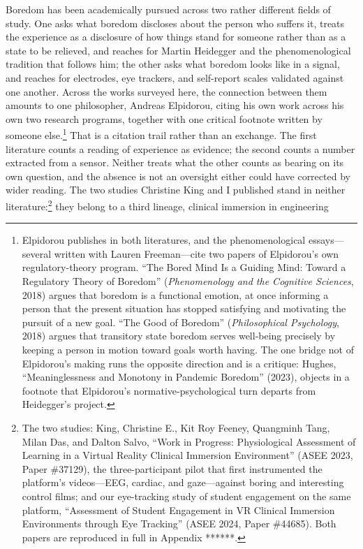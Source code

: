 Boredom has been academically pursued across two rather different fields of study. One asks
what boredom discloses about the person who suffers it, treats the experience as a disclosure
of how things stand for someone rather than as a state to be relieved, and reaches for Martin
Heidegger and the phenomenological tradition that follows him; the other asks what boredom
looks like in a signal, and reaches for electrodes, eye trackers, and self-report scales
validated against one another. Across the works surveyed here, the connection between them
amounts to one philosopher, Andreas Elpidorou, citing his own work across his own two research
programs, together with one critical footnote written by someone else.\footnote{Elpidorou
publishes in both literatures, and the phenomenological essays---several written with Lauren
Freeman---cite two papers of Elpidorou's own regulatory-theory program. ``The Bored Mind Is a
Guiding Mind: Toward a Regulatory Theory of Boredom'' (\textit{Phenomenology and the Cognitive
Sciences}, 2018) argues that boredom is a functional emotion, at once informing a person that
the present situation has stopped satisfying and motivating the pursuit of a new goal. ``The
Good of Boredom'' (\textit{Philosophical Psychology}, 2018) argues that transitory state
boredom serves well-being precisely by keeping a person in motion toward goals worth having.
The one bridge not of Elpidorou's making runs the opposite direction and is a critique:
Hughes, ``Meaninglessness and Monotony in Pandemic Boredom'' (2023), objects in a footnote
that Elpidorou's normative-psychological turn departs from Heidegger's project.} That is a
citation trail rather than an exchange. The first literature counts a reading of experience
as evidence; the second counts a number extracted from a sensor. Neither treats what the
other counts as bearing on its own question, and the absence is not an oversight either could
have corrected by wider reading. The two studies Christine King and I published stand in
neither literature:\footnote{The two studies: King, Christine E., Kit Roy Feeney, Quangminh
Tang, Milan Das, and Dalton Salvo, ``Work in Progress: Physiological Assessment of Learning
in a Virtual Reality Clinical Immersion Environment'' (ASEE 2023, Paper \#37129), the
three-participant pilot that first instrumented the platform's videos---EEG, cardiac, and
gaze---against boring and interesting control films; and our eye-tracking study of student
engagement on the same platform, ``Assessment of Student Engagement in VR Clinical Immersion
Environments through Eye Tracking'' (ASEE 2024, Paper \#44685). Both papers are reproduced in
full in Appendix ******.} they belong to a third lineage, clinical immersion in engineering
